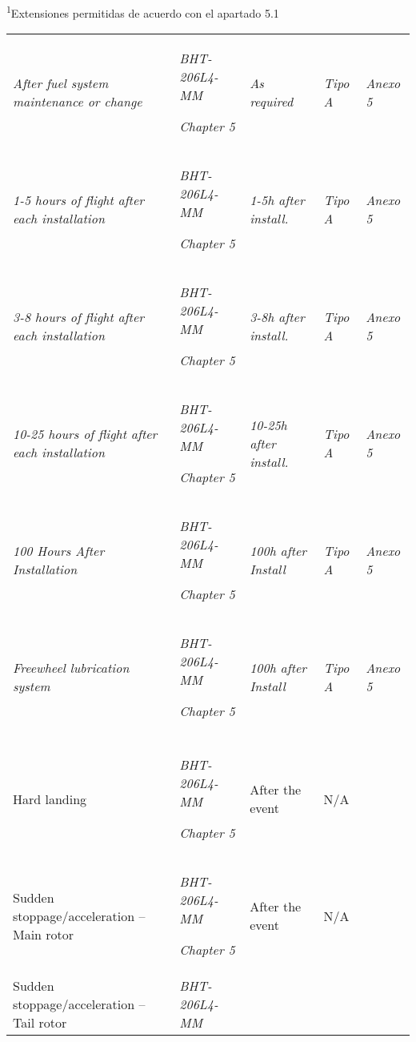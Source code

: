 \documentclass[
]{article}
\begin{document}
\textsuperscript{1}Extensiones permitidas de acuerdo con el apartado 5.1

\begin{longtable}[]{@{}|
  >{\raggedright\arraybackslash}p{}|
  >{\raggedright\arraybackslash}p{}|
  >{\raggedright\arraybackslash}p{}|
  >{\raggedright\arraybackslash}p{}|
  >{\raggedright\arraybackslash}p{}|@{}}
\hline
\multicolumn{5}{|l|}{\emph{\textbf{Special Inspections}}}\\
\hline

\emph{After fuel system maintenance or change} & \emph{BHT-206L4-MM}

\emph{Chapter 5} & \emph{As required} & \emph{Tipo A} & \emph{Anexo
5} \\
\hline
\emph{1-5 hours of flight after each installation} & \emph{BHT-206L4-MM}

\emph{Chapter 5} & \emph{1-5h after install.} & \emph{Tipo A} &
\emph{Anexo 5} \\
\hline
\emph{3-8 hours of flight after each installation} & \emph{BHT-206L4-MM}

\emph{Chapter 5} & \emph{3-8h after install.} & \emph{Tipo A} &
\emph{Anexo 5} \\
\hline
\emph{10-25 hours of flight after each installation} &
\emph{BHT-206L4-MM}

\emph{Chapter 5} & \emph{10-25h after install.} & \emph{Tipo A} &
\emph{Anexo 5} \\
\hline
\emph{100 Hours After Installation} & \emph{BHT-206L4-MM}

\emph{Chapter 5} & \emph{100h after Install} & \emph{Tipo A} &
\emph{Anexo 5} \\
\hline
\emph{Freewheel lubrication system} & \emph{BHT-206L4-MM}

\emph{Chapter 5} & \emph{100h after Install} & \emph{Tipo A} &
\emph{Anexo 5} \\
\hline
\multicolumn{5}{|l|}{\textbf{Conditional Inspections}}\\
\hline
Hard landing & \emph{BHT-206L4-MM}

\emph{Chapter 5} & After the event & N/A & \\
\hline
Sudden stoppage/acceleration -- Main rotor & \emph{BHT-206L4-MM}

\emph{Chapter 5} & After the event & N/A & \\
\hline
Sudden stoppage/acceleration -- Tail rotor & \emph{BHT-206L4-MM}


\end{longtable}
\end{document}
